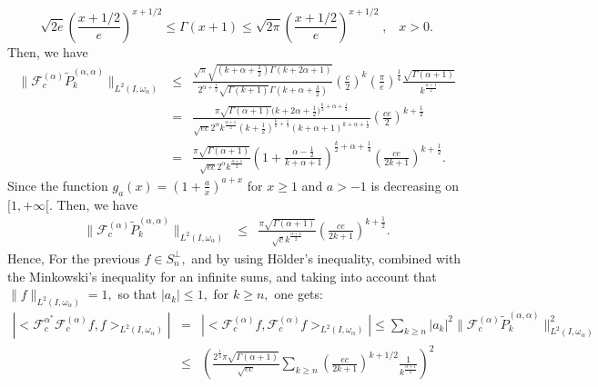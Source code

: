 \documentclass[]{article}
\newcommand{\wJ}{\widetilde P^{(\alpha,\alpha)}}
\newcounter{rea}
\begin{document}
\begin{equation}\label{3}
\sqrt{2e}\left(\frac{x+1/2}{e}\right)^{x+1/2}\leq\Gamma(x+1)\leq \sqrt{2\pi}\left(\frac{x+1/2}{e}\right)^{x+1/2}\;,\;\;\; x>0.
\end{equation}
Then, we have
\begin{eqnarray}
\| \mathcal F_c^{(\alpha)} \wJ_k\|_{L^2(I,\omega_{\alpha})} &\leq & \frac{\sqrt{\pi}\sqrt{(k+\alpha+\frac{1}{2})\Gamma(k+2\alpha+1)}}{2^{\alpha+\frac{1}{2}}\sqrt{\Gamma(k+1)}\Gamma(k+\alpha+\frac{3}{2})}\left(\frac{c}{2}\right) ^{k}\left(\frac{\pi}{e}\right)^{\frac{1}{4}}\frac{\sqrt{\Gamma(\alpha+1)}}{k^{\frac{\alpha+1}{2}}}\nonumber\\
&=&\frac{\pi \sqrt{\Gamma(\alpha+1)}\big(k+2\alpha+\frac{1}{2}\Big)^{\frac{k}{2}+\alpha+\frac{1}{4
}}}{\sqrt{ec}2^{\alpha}k^{\frac{\alpha+1}{2}}\left(k+\frac{1}{2}\right)^{\frac{k}{2}+\frac{1}{4}}\left(k+\alpha+1\right)^{k+\alpha+\frac{1}{2}}}
\left(\frac{ce}{2}\right) ^{k+\frac{1}{2
}}\nonumber\\
&=&\frac{\pi \sqrt{\Gamma(\alpha+1)}}{\sqrt{ec}2^{\alpha}k^{\frac{\alpha+1}{2}}}\left(1+\frac{\alpha-\frac{1}{2}}{k+\alpha+1}\right)^{\frac{k}{2}+\alpha+\frac{1}{4}}
\left(\frac{ce}{2k+1}\right) ^{k+\frac{1}{2}}.
\end{eqnarray}
Since the function $g_a(x)=\left(1+\frac{a}{x}\right)^{a+x}$ for
$x\geq1$ and $a>-1$ is decreasing on $[1,+\infty[$. Then, we have
\begin{eqnarray}
\| \mathcal F_c^{(\alpha)} \wJ_k\|_{L^2(I,\omega_{\alpha})} &\leq &\frac{\pi \sqrt{\Gamma(\alpha+1)}}{\sqrt{c}k^{\frac{\alpha+1}{2}}}
\left(\frac{ce}{2k+1}\right) ^{k+\frac{1}{2}}.\label{24}
\end{eqnarray}
Hence, For the previous $f\in S_n^{\perp},$  and by using H\"older's inequality, combined with  the Minkowski's inequality for an infinite sums, and taking into account that  $\|f\|_{L^2(I,\omega_{\alpha})}= 1,$ so that $|a_k|\leq 1,$ for $k\geq n,$  one gets:
\begin{eqnarray}
|< \mathcal F_c^{\alpha^*}\mathcal F_c^{(\alpha)} f,f>_{L^2(I,\omega_{\alpha})}|&=&|< \mathcal F_c^{(\alpha)} f,\mathcal F_c^{(\alpha)}f>_{L^2(I,\omega_{\alpha})}| \leq \sum_{k\geq n} |a_k|^2 \| \mathcal F_c^{(\alpha)} \wJ_k\|^2_{L^2(I,\omega_{\alpha})}\\
\label{Eq3.3}
&\leq&\left(\frac{2^\frac{1}{4}\pi \sqrt{\Gamma(\alpha+1)}}{\sqrt{ec}} \sum_{k\geq n} \left(\frac{ec}{2k+1}\right)^{k+1/2}\frac{1}{k^{\frac{\alpha+1}{2}}}\right)^2
\end{eqnarray}
\end{document}
